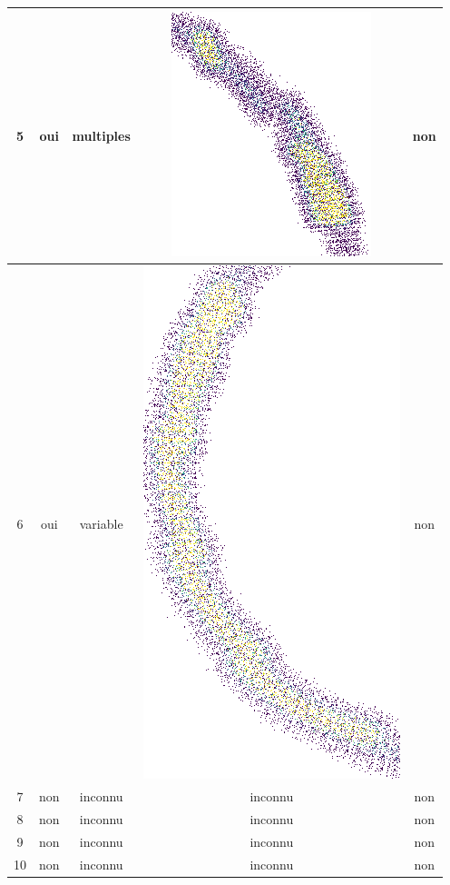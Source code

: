 \begin{table}[h]
\begin{tabular}{|c|c|c|c|c|}
\hline
5 & oui & multiples & \includegraphics[scale=0.2]{images/set27.png}  & non \\
\hline
6 & oui & variable & \includegraphics[scale=0.2]{images/set28.png}  & non \\
\hline
7 & non & inconnu & inconnu & non \\
\hline
8 & non & inconnu & inconnu & non \\
\hline
9 & non & inconnu & inconnu & non \\
\hline
10 & non & inconnu & inconnu  & non \\

\end{tabular}
\end{table}
